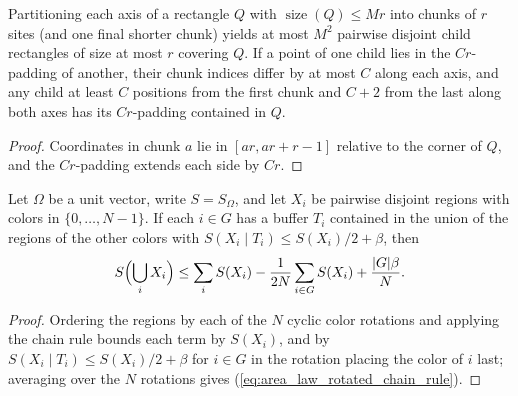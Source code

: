 \begin{lemma}
    \label{thm:area_law_box_children}
    \leanok
    Partitioning each axis of a rectangle $Q$ with $\operatorname{size}(Q)\le Mr$
    into chunks of $r$ sites (and one final shorter chunk) yields at most
    $M^2$ pairwise disjoint child rectangles of size at most $r$ covering $Q$.
    If a point of one child lies in the $Cr$-padding of another, their chunk
    indices differ by at most $C$ along each axis, and any child at least $C$
    positions from the first chunk and $C+2$ from the last along both axes has
    its $Cr$-padding contained in $Q$.
\end{lemma}
\begin{proof}\leanok
    Coordinates in chunk $a$ lie in $[ar,ar+r-1]$ relative to the corner of
    $Q$, and the $Cr$-padding extends each side by $Cr$.
\end{proof}

\begin{lemma}
    \label{thm:area_law_rotated_chain_rule}
    \leanok
    Let $\Omega$ be a unit vector, write $S=S_\Omega$, and let $X_i$ be
    pairwise disjoint regions with colors in $\{0,\dots,N-1\}$. If each
    $i\in G$ has a buffer $T_i$ contained in the union of the regions of the
    other colors with $S(X_i\mid T_i)\le S(X_i)/2+\beta$, then
    \begin{align}
        S\Bigl(\bigcup_iX_i\Bigr)\le\sum_iS(X_i)-\frac1{2N}\sum_{i\in G}S(X_i)
        +\frac{|G|\beta}N.
        \label{eq:area_law_rotated_chain_rule}
    \end{align}
\end{lemma}
\begin{proof}\leanok
    Ordering the regions by each of the $N$ cyclic color rotations and applying
    the chain rule bounds each term by $S(X_i)$, and by
    $S(X_i\mid T_i)\le S(X_i)/2+\beta$ for $i\in G$ in the rotation placing the
    color of $i$ last; averaging over the $N$ rotations gives
    (\ref{eq:area_law_rotated_chain_rule}).
\end{proof}

